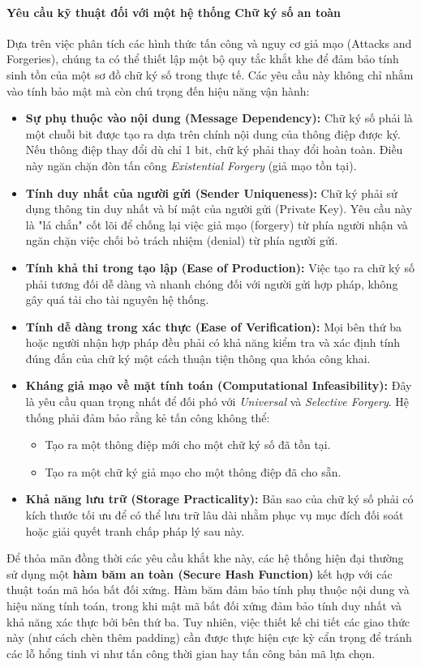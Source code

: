 \paragraph*{Yêu cầu kỹ thuật đối với một hệ thống Chữ ký số an toàn}

Dựa trên việc phân tích các hình thức tấn công và nguy cơ giả mạo (Attacks and Forgeries), chúng ta có thể thiết lập một bộ quy tắc khắt khe để đảm bảo tính sinh tồn của một sơ đồ chữ ký số trong thực tế. Các yêu cầu này không chỉ nhắm vào tính bảo mật mà còn chú trọng đến hiệu năng vận hành:

\begin{itemize}
    \item \textbf{Sự phụ thuộc vào nội dung (Message Dependency):} Chữ ký số phải là một chuỗi bit được tạo ra dựa trên chính nội dung của thông điệp được ký. Nếu thông điệp thay đổi dù chỉ 1 bit, chữ ký phải thay đổi hoàn toàn. Điều này ngăn chặn đòn tấn công \textit{Existential Forgery} (giả mạo tồn tại).
    \item \textbf{Tính duy nhất của người gửi (Sender Uniqueness):} Chữ ký phải sử dụng thông tin duy nhất và bí mật của người gửi (Private Key). Yêu cầu này là "lá chắn" cốt lõi để chống lại việc giả mạo (forgery) từ phía người nhận và ngăn chặn việc chối bỏ trách nhiệm (denial) từ phía người gửi.
    \item \textbf{Tính khả thi trong tạo lập (Ease of Production):} Việc tạo ra chữ ký số phải tương đối dễ dàng và nhanh chóng đối với người gửi hợp pháp, không gây quá tải cho tài nguyên hệ thống.
    \item \textbf{Tính dễ dàng trong xác thực (Ease of Verification):} Mọi bên thứ ba hoặc người nhận hợp pháp đều phải có khả năng kiểm tra và xác định tính đúng đắn của chữ ký một cách thuận tiện thông qua khóa công khai.
    \item \textbf{Kháng giả mạo về mặt tính toán (Computational Infeasibility):} Đây là yêu cầu quan trọng nhất để đối phó với \textit{Universal} và \textit{Selective Forgery}. Hệ thống phải đảm bảo rằng kẻ tấn công không thể:
    \begin{itemize}
        \item Tạo ra một thông điệp mới cho một chữ ký số đã tồn tại.
        \item Tạo ra một chữ ký giả mạo cho một thông điệp đã cho sẵn.
    \end{itemize}
    \item \textbf{Khả năng lưu trữ (Storage Practicality):} Bản sao của chữ ký số phải có kích thước tối ưu để có thể lưu trữ lâu dài nhằm phục vụ mục đích đối soát hoặc giải quyết tranh chấp pháp lý sau này.
\end{itemize}
Để thỏa mãn đồng thời các yêu cầu khắt khe này, các hệ thống hiện đại thường sử dụng một \textbf{hàm băm an toàn (Secure Hash Function)} kết hợp với các thuật toán mã hóa bất đối xứng. Hàm băm đảm bảo tính phụ thuộc nội dung và hiệu năng tính toán, trong khi mật mã bất đối xứng đảm bảo tính duy nhất và khả năng xác thực bởi bên thứ ba. Tuy nhiên, việc thiết kế chi tiết các giao thức này (như cách chèn thêm padding) cần được thực hiện cực kỳ cẩn trọng để tránh các lỗ hổng tinh vi như tấn công thời gian hay tấn công bản mã lựa chọn.
